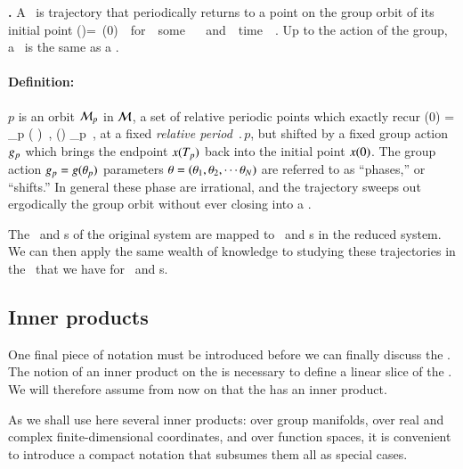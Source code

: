 \begin{definition}
\textbf{\Rpo.}
A \rpo\ is trajectory that periodically returns to a point on the group orbit of its initial point
\beq
\ssp(\period{})=\LieEl \, \ssp(0)
\,\, for \,\,  some \,\, \LieEl \in \Group \,\, and \,\, time \,\, \period{}.
\eeq
Up to the action of the group, a \rpo\ is the same as a \po.
\end{definition}

\paragraph{Definition:
           \Rpo}
$p$ is an orbit ${\cal M}_p$ in {\statesp} ${\cal M}$, a set of relative periodic
points which exactly recur
\beq
\ssp (0) = \LieEl_p \ssp ( )
    \,,\qquad
\ssp (\tau) \in \pS_p
    \,,
\label{RPOrelper1}
\eeq
at a fixed {\em relative period} $\period{p}$, but
shifted by a fixed group action ${g_p}$
which brings the endpoint $x ({T_{p}} ) $
back into the initial point $x (0) $.
The group action ${g_p}=g({\bf \theta}_p)$ parameters  %
${\bf \theta} = ({\bf \theta}_1,{\bf \theta}_2,\cdots{\bf \theta}_N)$
are referred to as ``phases,'' or ``shifts.''
%
In general these phase are irrational, and the trajectory  %
sweeps out ergodically the group orbit without ever closing
into a \po.

The \reqva\ and \rpo s of the original system are mapped to \eqva\ and \po s in the reduced system. We can then apply the same wealth of knowledge to studying these trajectories in the \reducedsp\ that we have for \eqva\ and \po s.
    \ifarticle
    \else


\subsection{Inner products}
\label{def:innerProduct}

One final piece of notation must be introduced before we can finally discuss the \mslices. The notion of an inner product on the {\statesp} is necessary to define a linear slice of the {\statesp}. We will therefore assume from now on that the {\statesp} has an inner product.

As we shall use here several inner products:
over group manifolds, over real and complex finite-dimensional coordinates, and over function spaces, it is convenient to introduce a compact notation that subsumes them all as special cases.

